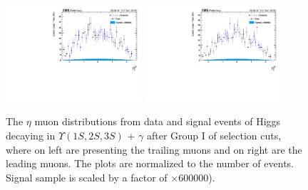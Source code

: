 \begin{figure}[!htbp]
\begin{center}
\includegraphics[width=0.45\textwidth]{figures_and_tables/outputPlots/HtoUpsilon_Cat0_ZZZZZ/nEvts/data_x_mc/withKinCuts/h_withKin_TrailingMu_eta}\hspace*{1.cm}
\includegraphics[width=0.45\textwidth]{figures_and_tables/outputPlots/HtoUpsilon_Cat0_ZZZZZ/nEvts/data_x_mc/withKinCuts/h_withKin_LeadingMu_eta}
\end{center}\vspace*{-.5cm}
\caption{The $\eta$ muon distributions from data and signal events of Higgs decaying in $\Upsilon(1S,2S,3S)$ + $\gamma$ after Group I of selection cuts, where on left are presenting the trailing muons and on right are the leading muons. The plots are normalized to the number of events. Signal sample is scaled by a factor of $\times 600000$).}
\label{fig:etaMuons_HtoUpsilon_Cat0_groupI_plus_II}
\end{figure}

